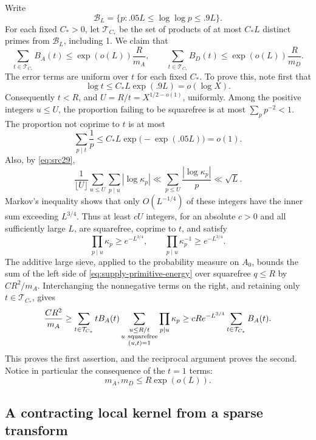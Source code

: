 Write
\[
 \mathcal B_L=\{p:.05L\le\log\log p\le.9L\}.
\]
For each fixed \(C_*>0\), let \(\mathcal T_{C_*}\) be the set of products
of at most \(C_*L\) distinct primes from \(\mathcal B_L\), including 1.
We claim that
\begin{equation}\label{eq:src30}
 \sum_{t\in\mathcal T_{C_*}}B_A(t)
       \le \exp(o(L))\frac R{m_A},
 \qquad
 \sum_{t\in\mathcal T_{C_*}}B_D(t)
       \le \exp(o(L))\frac R{m_D}.
\end{equation}
The error terms are uniform over \(t\) for each fixed \(C_*\).
To prove this, note first that
\[
 \log t\le C_*L\exp(.9L)=o(\log X).
\]
Consequently \(t<R\), and \(U=R/t=X^{1/2-o(1)}\), uniformly.
Among the positive integers \(u\le U\), the proportion failing to be
squarefree is at most \(\sum_p p^{-2}<1\). The proportion not coprime to
\(t\) is at most
\[
 \sum_{p\mid t}\frac1p
 \le C_*L\exp\bigl(-\exp(.05L)\bigr)=o(1).
\]
Also, by \eqref{eq:src29},
\[
 \frac1{\lfloor U\rfloor}\sum_{u\le U}
           \sum_{p\mid u}|\log\kappa_p|
 \ll\sum_{p\le U}\frac{|\log\kappa_p|}{p}
 \ll\sqrt L .
\]
Markov's inequality shows that only \(O(L^{-1/4})\) of these integers
have the inner sum exceeding \(L^{3/4}\). Thus at least \(cU\)
integers, for an absolute \(c>0\) and all sufficiently large \(L\), are
squarefree, coprime to \(t\), and satisfy
\[
 \prod_{p\mid u}\kappa_p\ge e^{-L^{3/4}},
 \qquad
 \prod_{p\mid u}\kappa_p^{-1}\ge e^{-L^{3/4}}.
\]
The additive large sieve, applied to the probability measure on \(A_0\),
bounds the sum of the left side of
\eqref{eq:supply-primitive-energy} over squarefree \(q\le R\) by
\(CR^2/m_A\). Interchanging the nonnegative terms on the right, and
retaining only \(t\in\mathcal T_{C_*}\), gives
\[
 \frac{CR^2}{m_A}
 \ge
 \sum_{t\in\mathcal T_{C_*}}tB_A(t)
     \sum_{\substack{u\le R/t\\u\ {\rm squarefree}\\(u,t)=1}}
          \prod_{p\mid u}\kappa_p
 \ge cR e^{-L^{3/4}}
          \sum_{t\in\mathcal T_{C_*}}B_A(t).
\]
This proves the first assertion, and the reciprocal argument proves
the second. Notice in particular the consequence of the \(t=1\) terms:
\begin{equation}\label{eq:supply-tail-size}
 m_A,m_D\le R\exp(o(L)).
\end{equation}

\subsection{A contracting local kernel from a sparse transform}

